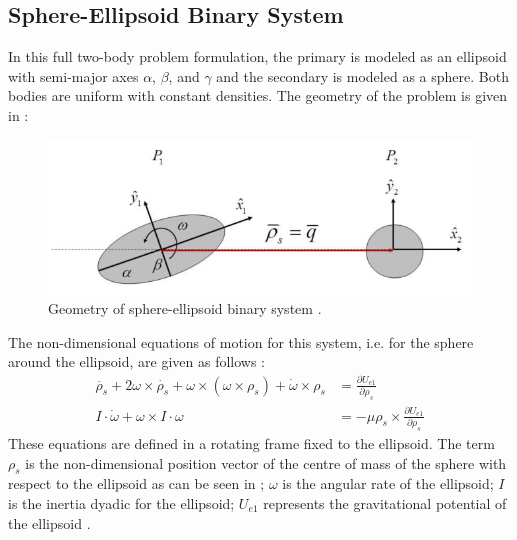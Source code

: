 \subsection{Sphere-Ellipsoid Binary System}
In this full two-body problem formulation, the primary is modeled as an ellipsoid with semi-major axes $\alpha$, $\beta$, and $\gamma$ and the secondary is modeled as a sphere. Both bodies are uniform with constant densities. The geometry of the problem is given in  \cite{chappaz}:
%
\begin{figure}[h]
\centering
\captionsetup{justification=centering}
\includegraphics[scale=0.7]{se.png}
\caption{Geometry of sphere-ellipsoid binary system \cite{chappaz}.}
\label{fig:se}
\end{figure}
\FloatBarrier
%
The non-dimensional equations of motion for this system, i.e. for the sphere around the ellipsoid, are given as follows \cite{chappaz}:
\begin{equation}
\begin{aligned}
\ddot{\rho_s} + 2\omega \times \dot{\rho_s} + \omega \times (\omega \times \rho_s) + \dot{\omega} \times \rho_s &= \frac{\partial U_{e1}}{\partial \rho_s} \\
I \cdot \dot{\omega} + \omega \times I \cdot \omega &= -\mu \rho_s \times \frac{\partial U_{e1}}{\partial \rho_s}
\end{aligned}
\end{equation}
%
These equations are defined in a rotating frame fixed to the ellipsoid. The term $\rho_s$ is the non-dimensional position vector of the centre of mass of the sphere with respect to the ellipsoid as can be seen in ; $\omega$ is the angular rate of the ellipsoid; $I$ is the inertia dyadic for the ellipsoid; $U_{e1}$ represents the gravitational potential of the ellipsoid \cite{chappaz}.

